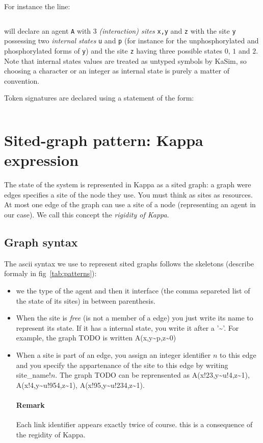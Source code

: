 \documentclass[11pt]{book}
\def\KaSim{\textsf{KaSim}}
\def\intstate{\textasciitilde}
\def\ttt#1{\texttt{#1}}
\newcommand{\Remark}{\paragraph{Remark}}
\begin{document}
For instance the line:
\begin{lstlisting}[language=kappa]
%agent: A(x,y~u~p,z~0~1~2) # Signature of agent A
\end{lstlisting}
will declare an agent \ttt{A} with 3 \emph{(interaction) sites}
\ttt{x,y} and \ttt{z} with the site \ttt{y} possessing two
\emph{internal states} \ttt{u} and \ttt{p} (for
instance for the unphosphorylated and phosphorylated forms of \ttt{y})
and the site \ttt{z} having three possible states $0$, $1$ and
$2$. Note that internal states values are
treated as untyped symbols by \KaSim, so choosing a character or an
integer as internal state is purely a matter of convention.

Token signatures are declared using a statement
of the form:
\begin{lstlisting}[language=kappa]
%token: ca+ # Signature of calcium token
\end{lstlisting}

\section{Sited-graph pattern: Kappa expression}

The state of the system is represented in Kappa as a sited graph: a
graph were edges specifies a site of the node they use. You must think
as sites as resources. At most one edge of the graph can use a site of
a node (representing an agent in our case). We call this concept the
\emph{rigidity of Kappa}.

\subsection{Graph syntax}
The ascii syntax we use to represent sited graphs follows the
skeletons (describe formaly in fig~\ref{tab:patterns}):
\begin{itemize}
\item we the type of the agent and then it interface (the comma
  separeted list of the state of its sites) in between parenthesis.
\item When the site is \emph{free} (is not a member of a edge) you
  just write its name to represent its state. If it has a internal
  state, you write it after a '\intstate'. For example, the graph
  TODO is written A(x,y\intstate{}p,z\intstate{}0)
\item When a site is part of an edge, you assign an integer identifier
  $n$ to this edge and you specify the appartenance of the site to
  this edge by writing site\_name$!n$. The graph TODO can be
  reprensented as A(x!23,y\intstate{}u!4,z\intstate{}1),
  A(x!4,y\intstate{}u!954,z\intstate{}1),
  A(x!95,y\intstate{}u!234,z\intstate{}1).

  \Remark{Each link identifier appears exactly twice of course. this is a
  consequence of the regidity of Kappa.}
\end{itemize}
\end{document}
